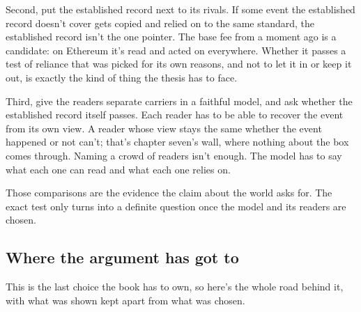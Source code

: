 \documentclass[11pt,twoside]{article}
\theoremstyle{thielethm}
\theoremstyle{thieledef}
\theoremstyle{thieledef}
\theoremstyle{thieledef}
\theoremstyle{thielethm}
\theoremstyle{thieleobs}
\theoremstyle{thielethm}
\begin{document}
Second, put the established record next to its rivals. If some event the established record doesn't cover gets copied and relied on to the same standard, the established record isn't the one pointer. The base fee from a moment ago is a candidate: on Ethereum it's read and acted on everywhere. Whether it passes a test of reliance that was picked for its own reasons, and not to let it in or keep it out, is exactly the kind of thing the thesis has to face.

Third, give the readers separate carriers in a faithful model, and ask whether the established record itself passes. Each reader has to be able to recover the event from its own view. A reader whose view stays the same whether the event happened or not can't; that's chapter seven's wall, where nothing about the box comes through. Naming a crowd of readers isn't enough. The model has to say what each one can read and what each one relies on.

Those comparisons are the evidence the claim about the world asks for. The exact test only turns into a definite question once the model and its readers are chosen.

\subsection{Where the argument has got to}

This is the last choice the book has to own, so here's the whole road behind it, with what was shown kept apart from what was chosen.
\end{document}
